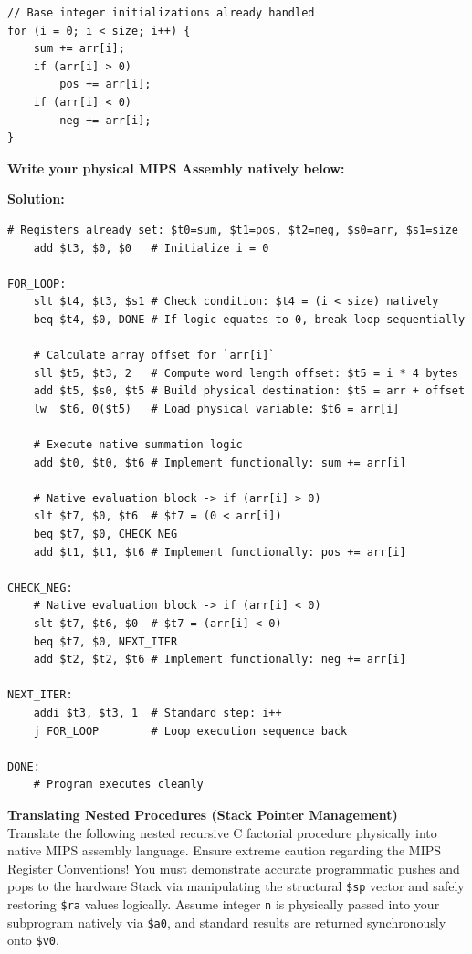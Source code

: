 \documentclass[letterpaper]{report}
\begin{document}
\begin{center}
\lstset{language=C,basicstyle=\ttfamily, numbers=none, gobble=0}
\begin{lstlisting}[frame=single]
// Base integer initializations already handled
for (i = 0; i < size; i++) {
    sum += arr[i];
    if (arr[i] > 0)
        pos += arr[i];
    if (arr[i] < 0)
        neg += arr[i];
}
\end{lstlisting}
\end{center}

\vspace{0.2in}
\textbf{Write your physical MIPS Assembly natively below:}

{\color{red} \textbf{Solution:}}
\begin{center}
\begin{lstlisting}[frame=single]
# Registers already set: $t0=sum, $t1=pos, $t2=neg, $s0=arr, $s1=size
    add $t3, $0, $0   # Initialize i = 0

FOR_LOOP:
    slt $t4, $t3, $s1 # Check condition: $t4 = (i < size) natively
    beq $t4, $0, DONE # If logic equates to 0, break loop sequentially
    
    # Calculate array offset for `arr[i]`
    sll $t5, $t3, 2   # Compute word length offset: $t5 = i * 4 bytes
    add $t5, $s0, $t5 # Build physical destination: $t5 = arr + offset
    lw  $t6, 0($t5)   # Load physical variable: $t6 = arr[i]
    
    # Execute native summation logic
    add $t0, $t0, $t6 # Implement functionally: sum += arr[i]
    
    # Native evaluation block -> if (arr[i] > 0)
    slt $t7, $0, $t6  # $t7 = (0 < arr[i])
    beq $t7, $0, CHECK_NEG
    add $t1, $t1, $t6 # Implement functionally: pos += arr[i]
    
CHECK_NEG:
    # Native evaluation block -> if (arr[i] < 0)
    slt $t7, $t6, $0  # $t7 = (arr[i] < 0)
    beq $t7, $0, NEXT_ITER
    add $t2, $t2, $t6 # Implement functionally: neg += arr[i]
    
NEXT_ITER:
    addi $t3, $t3, 1  # Standard step: i++
    j FOR_LOOP        # Loop execution sequence back

DONE:
    # Program executes cleanly
\end{lstlisting}
\end{center}
\ep
\vf
\newpage

%
 {\bf Translating Nested Procedures (Stack Pointer Management)} \\
Translate the following nested recursive C factorial procedure physically into native MIPS assembly language. Ensure extreme caution regarding the MIPS Register Conventions! You must demonstrate accurate programmatic pushes and pops to the hardware Stack via manipulating the structural \texttt{\$sp} vector and safely restoring \texttt{\$ra} values logically. Assume integer \texttt{n} is physically passed into your subprogram natively via \texttt{\$a0}, and standard results are returned synchronously onto \texttt{\$v0}.
\end{document}
